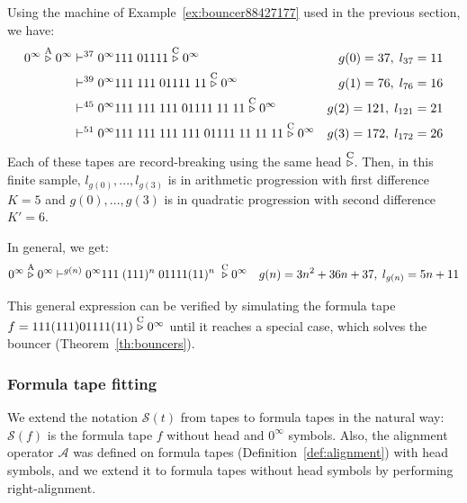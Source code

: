 \begin{example}\label{ex:linquad}
    Using the machine of Example~\ref{ex:bouncer88427177} used in the previous section, we have:
    \begin{align*}
        0^\infty \stackrel{\text{A}}\triangleright 0^\infty & \vdash^{37} 0^\infty 111\; 01111 \stackrel{\text{C}}\triangleright 0^\infty                                 & g(0) = 37,\; l_{37} = 11   \\
                                           & \vdash^{39}   0^\infty111\; 111 \;01111 \;11\stackrel{\text{C}}\triangleright0^\infty                       & g(1) = 76,\; l_{76} = 16   \\
                                           & \vdash^{45}   0^\infty111\; 111\;111\; 01111\; 11\; 11 \stackrel{\text{C}}\triangleright0^\infty            & g(2) = 121,\; l_{121} = 21 \\
                                           & \vdash^{51}   0^\infty111\; 111\;111\; 111\; 01111\; 11\; 11\; 11 \stackrel{\text{C}}\triangleright0^\infty & g(3) = 172,\; l_{172} = 26 \\
    \end{align*}
    Each of these tapes are record-breaking using the same head $\stackrel{\text{C}}\triangleright$. Then, in this finite sample, $l_{g(0)},...,l_{g(3)}$ is in arithmetic progression with first difference $K=5$ and $g(0), ..., g(3)$ is in quadratic progression with second difference $K'=6$.

    In general, we get:
    $$0^\infty \stackrel{\text{A}}\triangleright 0^\infty  \vdash^{g(n)} 0^\infty 111\; (111)^n\; 01111 (11)^n\; \stackrel{\text{C}}\triangleright 0^\infty   \quad g(n) = 3n^2 + 36n + 37,\; l_{g(n)} = 5n+11$$

    This general expression can be verified by simulating the formula tape $f=111(111)01111(11)\stackrel{\text{C}}\triangleright0^\infty$ until it reaches a special case, which solves the bouncer (Theorem~\ref{th:bouncers}).

\end{example}

\newpage
\subsubsection{Formula tape fitting}

We extend the notation $\mathcal{S}(t)$ from tapes to formula tapes in the natural way: $\mathcal{S}(f)$ is the formula tape $f$ without head and $0^\infty$ symbols. Also, the alignment operator $\mathcal{A}$ was defined on formula tapes (Definition~\ref{def:alignment}) with head symbols, and we extend it to formula tapes without head symbols by performing right-alignment.

